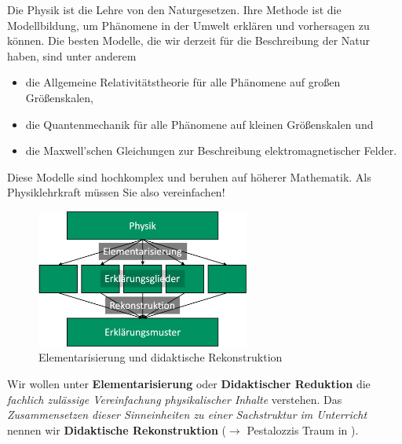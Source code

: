 Die Physik ist die Lehre von den Naturgesetzen. Ihre Methode ist die Modellbildung, um Phänomene in der Umwelt erklären und vorhersagen zu können. Die besten Modelle, die wir derzeit für die Beschreibung der Natur haben, sind unter anderem
\begin{itemize}
	\item die Allgemeine Relativitätstheorie für alle Phänomene auf großen Größenskalen,
	\item die Quantenmechanik für alle Phänomene auf kleinen Größenskalen und
	\item die Maxwell'schen Gleichungen zur Beschreibung elektromagnetischer Felder.
\end{itemize}
Diese Modelle sind hochkomplex und beruhen auf höherer Mathematik. Als Physiklehrkraft müssen Sie also vereinfachen!

\begin{figure}[hb]
	\centering
	\includegraphics[width=7cm]{Bilder/elementarisierung}
	\caption{Elementarisierung und didaktische Rekonstruktion}\label{fig:elementarisierung}
\end{figure}

\mip
Wir wollen unter \textbf{Elementarisierung} oder \textbf{Didaktischer Reduktion} die \emph{fachlich zulässige Vereinfachung physikalischer Inhalte} verstehen. Das \emph{Zusammensetzen dieser Sinneinheiten zu einer Sachstruktur im Unterricht} nennen wir \textbf{Didaktische Rekonstruktion} ($\to$ Pestalozzis Traum in \cite[S. 158 f.]{KircherGirwidzHaussler1}). 


\bip


